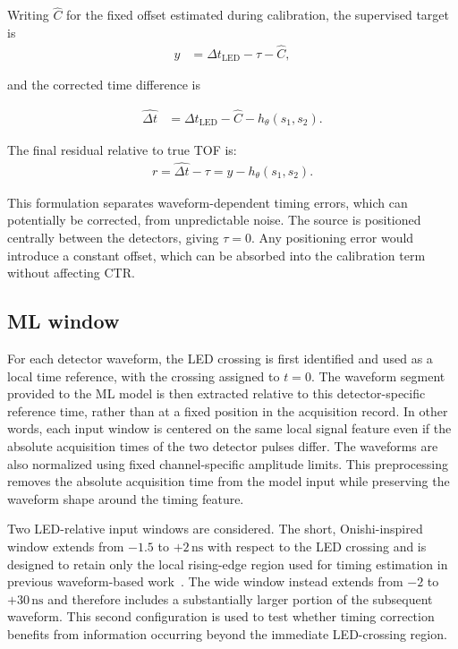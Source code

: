 Writing $\widehat C$ for the fixed offset estimated during
calibration, the supervised target  is
\begin{align}
y &= \Delta t_{\mathrm{LED}}-\tau-\widehat C,
\label{eq:ml-target}
\end{align}

and the corrected time difference is

\begin{align}
\widehat{\Delta t}
&=\Delta t_{\mathrm{LED}}-\widehat C
-h_\theta(s_1,s_2).
\label{eq:corrected-time}
\end{align}



The final residual relative to true TOF is:
\begin{align}
r=\widehat{\Delta t}-\tau=y-h_\theta(s_1,s_2).
\label{eq:residual}
\end{align}

This formulation separates waveform-dependent timing errors, 
which can potentially be corrected, from unpredictable noise. 
The source is positioned centrally between the detectors, 
giving $\tau=0$. 
Any positioning error would introduce a constant offset, 
which can be absorbed into the calibration term without affecting CTR.

\subsection{ML window}

For each detector waveform, the LED crossing is first identified and
used as a local time reference, with the crossing assigned to
$t=0$. The waveform segment provided to the ML model is then extracted
relative to this detector-specific reference time, rather than at a
fixed position in the acquisition record. In other words, each input
window is centered on the same local signal feature even if the
absolute acquisition times of the two detector pulses differ. The
waveforms are also normalized using fixed channel-specific amplitude
limits. This preprocessing removes the absolute acquisition time from
the model input while preserving the waveform shape around the timing
feature.

Two LED-relative input windows are considered. The short,
Onishi-inspired window extends from $-1.5$ to $+2\,\mathrm{ns}$ with
respect to the LED crossing and is designed to retain only the local
rising-edge region used for timing estimation in previous
waveform-based work~\cite{onishi2022}. The wide window instead extends
from $-2$ to $+30\,\mathrm{ns}$ and therefore includes a substantially 
larger portion of the subsequent waveform. 
This second configuration is used to test whether timing
correction benefits from information occurring beyond the immediate
LED-crossing region.

